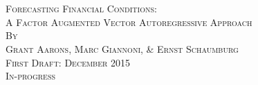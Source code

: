 \begin{titlepage}
\begin{center}

\textsc{\LARGE  }\\[0.2cm]
\textsc{\LARGE }\\[7cm]

\textsc{\LARGE Forecasting Financial Conditions:}\\[0.8cm]
\textsc{\large A Factor Augmented Vector Autoregressive Approach}\\[0.8cm]

\textsc{By}\\[0.6cm]
\textsc{Grant Aarons, Marc Giannoni, \& Ernst Schaumburg}\\[6cm]

\textsc{First Draft: December 2015}\\[0.5cm]
\textsc{In-progress}\\[6cm]
\vfill


\end{center}
\end{titlepage} 
